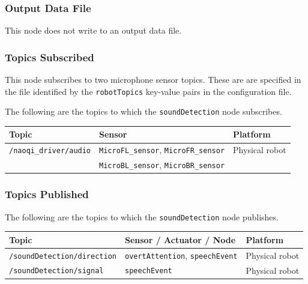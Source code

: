 \documentclass{CSSRforAfrica}
\begin{document}
{{\subsubsection*{Output Data File}
This node does not write to an output data file.


\subsubsection*{Topics Subscribed}
This node  subscribes to two microphone sensor topics.  
These are are specified in the file identified by the {\small \verb+robotTopics+ }    key-value pairs in the configuration file.

The following are the topics to which the {\small \verb+soundDetection+} node subscribes.

\begin{center}
\begin{tabularx}{\linewidth}{| l | l | X|}
\hline 
{\small Topic }                               & {\small Sensor }                            &  {\small Platform}       \\
\hline
{\footnotesize \verb+/naoqi_driver/audio+ }  & {\footnotesize \verb+MicroFL_sensor+}, {\footnotesize \verb+MicroFR_sensor+}      & {\small Physical robot } \\ 
                                                                        & {\footnotesize \verb+MicroBL_sensor+}, {\footnotesize \verb+MicroBR_sensor+}      &  \\ 
\hline
\end{tabularx}
\end{center}


\subsubsection*{Topics Published}

The following are the topics to which the {\small \verb+soundDetection+} node publishes.
 
\begin{center}
\begin{tabularx}{\linewidth}{| l | l | X|}
\hline 
{\small Topic }                                                                                & {\small Sensor / Actuator / Node}    &  {\small Platform}       \\
\hline
{\footnotesize \verb+/soundDetection/direction+ }  & {\footnotesize \verb+overtAttention+, \verb+speechEvent+ } & {\small Physical robot} \\ 
\hline
{\footnotesize \verb+/soundDetection/signal+ }  & {\footnotesize \verb+speechEvent+  } & {\small Physical robot} \\ 
\hline
\end{tabularx}
\end{center}

}}
\end{document}
